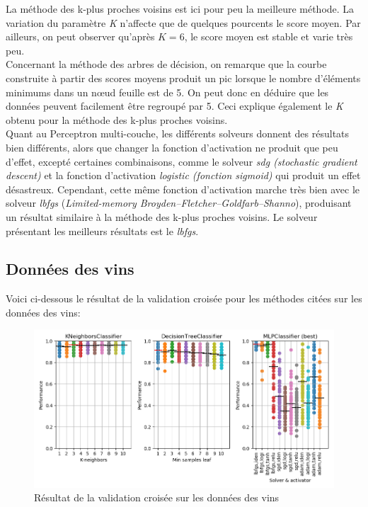 \documentclass[11pt, a4paper]{article}
\begin{document}
La méthode des k-plus proches voisins est ici pour peu la meilleure méthode.
La variation du paramètre \textit{K} n'affecte que de quelques pourcents le score moyen.
Par ailleurs, on peut observer qu'après $K = 6$,
le score moyen est stable et varie très peu. \\

Concernant la méthode des arbres de décision,
on remarque que la courbe construite à partir des scores moyens produit un pic lorsque
le nombre d'éléments minimums dans un nœud feuille est de 5.
On peut donc en déduire que les données peuvent facilement être regroupé par 5.
Ceci explique également le \textit{K} obtenu pour la méthode des k-plus proches voisins. \\

Quant au Perceptron multi-couche, les différents solveurs donnent des résultats bien différents,
alors que changer la fonction d'activation ne produit que peu d'effet,
excepté certaines combinaisons,
comme le solveur \textit{sdg (stochastic gradient descent)} et la fonction d'activation \textit{logistic (fonction sigmoid)} qui
produit un effet désastreux.
Cependant, cette même fonction d'activation marche très bien avec le solveur \textit{lbfgs} (\textit{Limited-memory Broyden–Fletcher–Goldfarb–Shanno}),
produisant un résultat similaire à la méthode des k-plus proches voisins.
Le solveur présentant les meilleurs résultats est le \textit{lbfgs}.

\newpage

\subsection{Données des vins}

Voici ci-dessous le résultat de la validation croisée pour les méthodes citées sur les données des vins:

\begin{figure}[H]
    \begin{center}
        \includegraphics[width=1\textwidth]{ex2_wine}
    \end{center}
    \caption{Résultat de la validation croisée sur les données des vins}
    \label{Résultat de la validation croisée sur les données des vins}
\end{figure}
\end{document}
